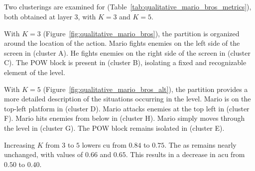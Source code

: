 \newpage
\subsection{\MarioBrosName}

Two clusterings are examined for \MarioBrosName (Table~\ref{tab:qualitative_mario_bros_metrics}), both obtained at layer 3, with $K=3$ and $K=5$.

With $K=3$ (Figure~\ref{fig:qualitative_mario_bros}), the partition is organized around the location of the action.
Mario fights enemies on the left side of the screen in (cluster A).
He fights enemies on the right side of the screen in (cluster C).
The POW block is present in (cluster B), isolating a fixed and recognizable element of the level.

With $K=5$ (Figure~\ref{fig:qualitative_mario_bros_alt}), the partition provides a more detailed description of the situations occurring in the level.
Mario is on the top-left platform in (cluster D).
Mario attacks enemies at the top left in (cluster F).
Mario hits enemies from below in (cluster H).
Mario simply moves through the level in (cluster G).
The POW block remains isolated in (cluster E).

Increasing $K$ from $3$ to $5$ lowers \gls{cu} from $0.84$ to $0.75$.
The \gls{as} remains nearly unchanged, with values of $0.66$ and $0.65$.
This results in a decrease in \gls{acu} from $0.50$ to $0.40$.

